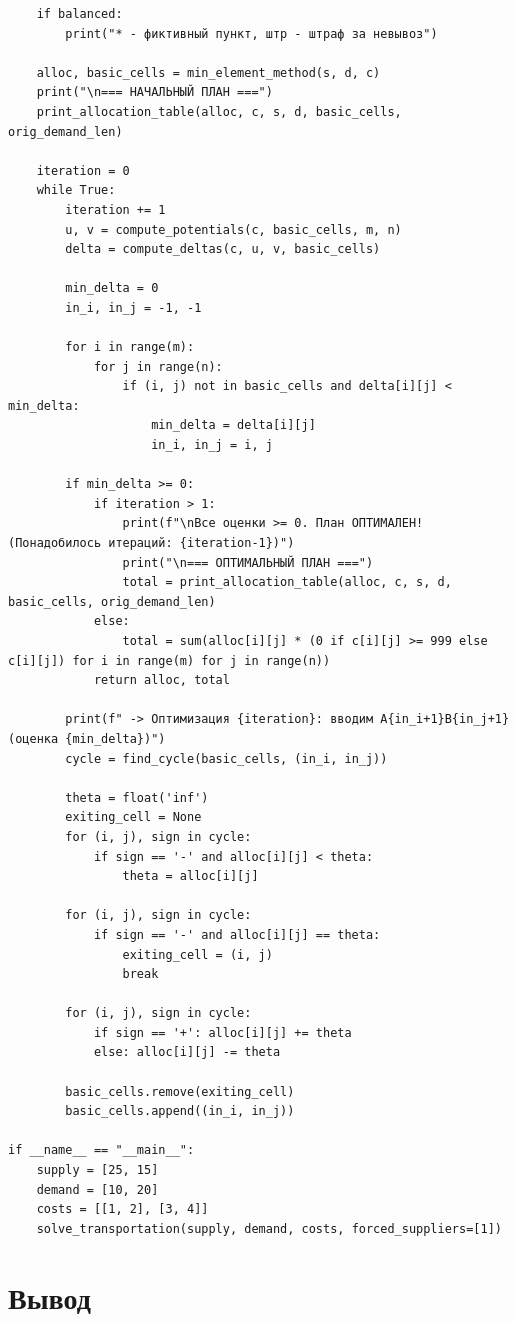 \documentclass[oneside,a4paper,14pt]{extarticle}
\begin{document}
\begin{verbatim}
    if balanced:
        print("* - фиктивный пункт, штр - штраф за невывоз")

    alloc, basic_cells = min_element_method(s, d, c)
    print("\n=== НАЧАЛЬНЫЙ ПЛАН ===")
    print_allocation_table(alloc, c, s, d, basic_cells, orig_demand_len)

    iteration = 0
    while True:
        iteration += 1
        u, v = compute_potentials(c, basic_cells, m, n)
        delta = compute_deltas(c, u, v, basic_cells)

        min_delta = 0
        in_i, in_j = -1, -1

        for i in range(m):
            for j in range(n):
                if (i, j) not in basic_cells and delta[i][j] < min_delta:
                    min_delta = delta[i][j]
                    in_i, in_j = i, j

        if min_delta >= 0:
            if iteration > 1:
                print(f"\nВсе оценки >= 0. План ОПТИМАЛЕН! (Понадобилось итераций: {iteration-1})")
                print("\n=== ОПТИМАЛЬНЫЙ ПЛАН ===")
                total = print_allocation_table(alloc, c, s, d, basic_cells, orig_demand_len)
            else:
                total = sum(alloc[i][j] * (0 if c[i][j] >= 999 else c[i][j]) for i in range(m) for j in range(n))
            return alloc, total

        print(f" -> Оптимизация {iteration}: вводим A{in_i+1}B{in_j+1} (оценка {min_delta})")
        cycle = find_cycle(basic_cells, (in_i, in_j))

        theta = float('inf')
        exiting_cell = None
        for (i, j), sign in cycle:
            if sign == '-' and alloc[i][j] < theta:
                theta = alloc[i][j]

        for (i, j), sign in cycle:
            if sign == '-' and alloc[i][j] == theta:
                exiting_cell = (i, j)
                break

        for (i, j), sign in cycle:
            if sign == '+': alloc[i][j] += theta
            else: alloc[i][j] -= theta

        basic_cells.remove(exiting_cell)
        basic_cells.append((in_i, in_j))

if __name__ == "__main__":
    supply = [25, 15]
    demand = [10, 20]
    costs = [[1, 2], [3, 4]]
    solve_transportation(supply, demand, costs, forced_suppliers=[1])

\end{verbatim}

\newpage
\section*{Вывод}
\end{document}
